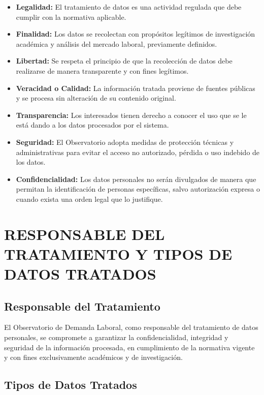 \documentclass[11pt,oneside,letterpaper]{article}
\begin{document}
\begin{itemize}
    \item \textbf{Legalidad:} El tratamiento de datos es una actividad regulada que debe cumplir con la normativa aplicable.
    \item \textbf{Finalidad:} Los datos se recolectan con propósitos legítimos de investigación académica y análisis del mercado laboral, previamente definidos.
    \item \textbf{Libertad:} Se respeta el principio de que la recolección de datos debe realizarse de manera transparente y con fines legítimos.
    \item \textbf{Veracidad o Calidad:} La información tratada proviene de fuentes públicas y se procesa sin alteración de su contenido original.
    \item \textbf{Transparencia:} Los interesados tienen derecho a conocer el uso que se le está dando a los datos procesados por el sistema.
    \item \textbf{Seguridad:} El Observatorio adopta medidas de protección técnicas y administrativas para evitar el acceso no autorizado, pérdida o uso indebido de los datos.
    \item \textbf{Confidencialidad:} Los datos personales no serán divulgados de manera que permitan la identificación de personas específicas, salvo autorización expresa o cuando exista una orden legal que lo justifique.
\end{itemize}

\newpage

\section{RESPONSABLE DEL TRATAMIENTO Y TIPOS DE DATOS TRATADOS}

\subsection{Responsable del Tratamiento}

El Observatorio de Demanda Laboral, como responsable del tratamiento de datos personales, se compromete a garantizar la confidencialidad, integridad y seguridad de la información procesada, en cumplimiento de la normativa vigente y con fines exclusivamente académicos y de investigación.

\subsection{Tipos de Datos Tratados}
\end{document}

